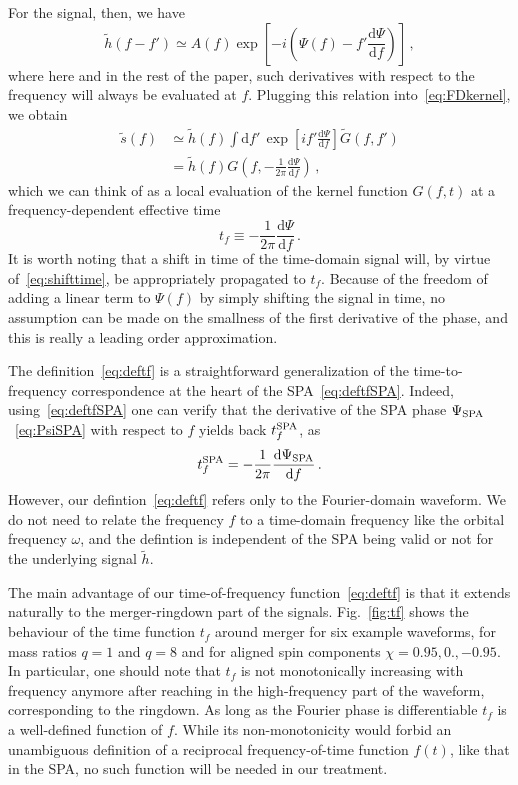 \documentclass[aps,showpacs,twocolumn,
prd,superscriptaddress,nofootinbib]{revtex4-1}
\newcommand{\be}{\begin{equation}}
\newcommand{\ee}{\end{equation}}
\newcommand\ud{{\mathrm{d}}}
\newcommand{\nn}{\nonumber}
\newcommand{\tf}{t_{f}}
\newcommand{\tfSPA}{t_{f}^{\rm SPA}}
\newcommand{\jgb}[1]{{\color{DarkGreen} #1}}
\begin{document}
For the signal, then, we have
\be
	\tilde{h}(f-f') \simeq A(f) \exp\left[ -i\left( \Psi(f) - f' \frac{\ud \Psi}{\ud f} \right) \right] \,,\label{eq:leadingorderwf}
\ee
where here and in the rest of the paper, such derivatives with respect to the frequency will always be evaluated at $f$. Plugging this relation into~\eqref{eq:FDkernel}, we obtain
\begin{align}
	\tilde{s}(f) &\simeq \tilde{h}(f) \int \ud f' \, \exp\left[ i f' \frac{\ud \Psi}{\ud f} \right] \tilde{G}(f,f') \nn\\
	&= \tilde{h}(f) G\left( f, -\frac{1}{2\pi} \frac{\ud \Psi}{\ud f} \right) \,,\label{eq:leadingorderresponse}
\end{align}
\jgb{which we can think of as a local evaluation of the kernel function $G(f,t)$ at a frequency-dependent effective time}
\be\label{eq:deftf}
	\tf \equiv -\frac{1}{2\pi} \frac{\ud \Psi}{\ud f} \,.
\ee
It is worth noting that a shift in time of the time-domain signal will, by virtue of~\eqref{eq:shifttime}, be appropriately propagated to $t_{f}$. Because of the freedom of adding a linear term to $\Psi(f)$ by simply shifting the signal in time, no assumption can be made on the smallness of the first derivative of the phase, and this is really a leading order approximation.

The definition~\eqref{eq:deftf} is a straightforward generalization of the time-to-frequency correspondence at the heart of the SPA~\eqref{eq:deftfSPA}. Indeed, using~\eqref{eq:deftfSPA} one can verify that the derivative of the SPA phase $\Psi_{\rm SPA}$~\eqref{eq:PsiSPA} with respect to $f$ yields back $\tfSPA$, as
\be
	\tfSPA = -\frac{1}{2\pi} \frac{\ud \Psi_{\rm SPA}}{\ud f} \,.
\ee
However, our defintion~\eqref{eq:deftf} refers only to the Fourier-domain waveform. We do not need to relate the frequency $f$ to a time-domain frequency like the orbital frequency $\omega$, and the defintion is independent of the SPA being valid or not for the underlying signal $\tilde{h}$.

The main advantage of our time-of-frequency function~\eqref{eq:deftf} is that it extends naturally to the merger-ringdown part of the signals. Fig.~\ref{fig:tf} shows the behaviour of the time function $\tf$ around merger for six example waveforms, for mass ratios $q=1$ and $q=8$ and for aligned spin components $\chi=0.95,0.,-0.95$. In particular, one should note that $\tf$ is not monotonically increasing with frequency anymore after reaching in the high-frequency part of the waveform, corresponding to the ringdown. \jgb{As long as the Fourier phase is differentiable $t_{f}$ is a well-defined function of $f$. While its non-monotonicity would forbid an unambiguous definition of a reciprocal frequency-of-time function $f(t)$, like that in the SPA, no such function will be needed in our treatment.}
\end{document}
